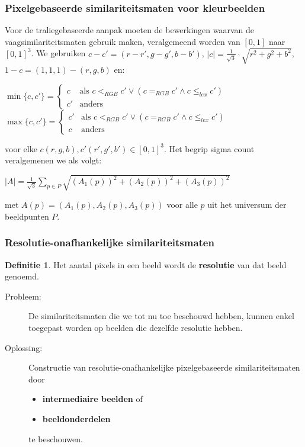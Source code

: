 \documentclass[dutch]{beamer}
\theoremstyle{definition}
\newtheorem{definitie}[theorem]{Definitie}
\theoremstyle{remark}
\theoremstyle{example}
\begin{document}
\frame
{ 
  \frametitle{Pixelgebaseerde similariteitsmaten voor kleurbeelden}

  Voor de traliegebaseerde aanpak moeten de bewerkingen waarvan de 
  vaagsimilariteitsmaten gebruik maken, veralgemeend worden van 
  $[0,1]$ naar $[0,1]^3$. We gebruiken $c - c' = (r-r',g-g',b-b')$, 
  $|c| = \frac{1}{\sqrt{3}} \cdot \sqrt{r^2 + g^2 + b^2}$, $1 - c = (1,1,1) - (r,g,b)$ en:
  \begin{minipage}{\textwidth}
    \vspace{4pt}
    \scriptsize
    \centering
    $\min \{c,c'\} = \begin{cases}
    c & \text{als } c <_{RGB} c' \lor (c =_{RGB} c' \land c \leq_{lex} c') \\
    c' & \text{anders}
    \end{cases}$\\[2pt]
    $\max \{c,c'\} = \begin{cases}
    c' & \text{als } c <_{RGB} c' \lor (c =_{RGB} c' \land c \leq_{lex} c') \\
    c & \text{anders}
    \end{cases}$
    \vspace{4pt}
  \end{minipage}
  voor elke $c(r,g,b),c'(r',g',b') \in [0,1]^3$. 
  Het begrip sigma count veralgemenen we als volgt:
  \begin{minipage}{\textwidth}
  \vspace{4pt}
  \scriptsize
  \centering
  $\displaystyle |A|=\frac{1}{\sqrt{3}}\sum_{p \in P}\sqrt{(A_1(p))^2+(A_2(p))^2+(A_3(p))^2}$
  \vspace{4pt}
  \end{minipage}
  met $A(p)=(A_1(p),A_2(p),A_3(p))$ voor alle $p$ uit het
  universum der beeldpunten $P$.
}
\frame
{
  \frametitle{Resolutie-onafhankelijke similariteitsmaten}
  
  \begin{definitie}
  Het aantal pixels in een beeld wordt de \textbf{resolutie} van dat beeld genoemd.
  \end{definitie}
  \begin{description}
	\item[Probleem:] De similariteitsmaten die we tot nu toe beschouwd hebben, kunnen
	enkel toegepast worden op beelden die dezelfde resolutie hebben.
	\item[Oplossing:] Constructie van resolutie-onafhankelijke 
	pixelgebaseerde similariteitsmaten door
	\begin{itemize}
      \item \textbf{intermediaire beelden} of 
      \item \textbf{beeldonderdelen} 
    \end{itemize}
    te beschouwen.
  \end{description}
}
\end{document}
